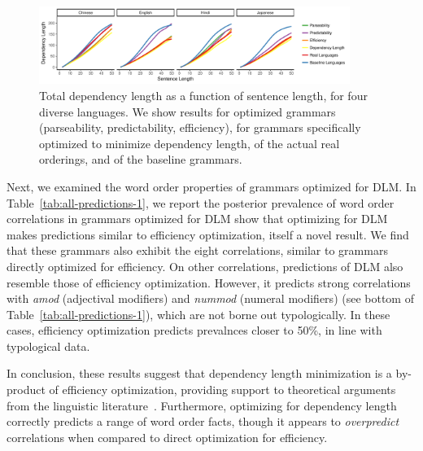 \documentclass[10pt,twoside,lineno]{article}
\begin{document}
\begin{figure}[ht]
    \centering
    \includegraphics[width=0.9\textwidth]{../results/dependency-length/figures/depLength-facet.pdf} 
        \caption{Total dependency length as a function of sentence length, for four diverse languages. We show results for optimized grammars (parseability, predictability, efficiency), for grammars specifically optimized to minimize dependency length, of the actual real orderings, and of the baseline grammars.}
    \label{fig:dlm-4langs}
\end{figure}


Next, we examined the word order properties of grammars optimized for DLM.
In Table~\ref{tab:all-predictions-1}, we report the posterior prevalence of word order correlations in grammars optimized for DLM show that optimizing for DLM makes predictions similar to efficiency optimization, itself a novel result.
We find that these grammars also exhibit the eight correlations, similar to grammars directly optimized for efficiency.
On other correlations, predictions of DLM also resemble those of efficiency optimization.
However, it predicts strong correlations with \textit{amod} (adjectival modifiers) and \textit{nummod} (numeral modifiers) (see bottom of Table~\ref{tab:all-predictions-1}), which are not borne out typologically.
In these cases, efficiency optimization predicts prevalnces closer to 50\%, in line with typological data.

In conclusion, these results suggest that dependency length minimization is a by-product of efficiency optimization, providing support to theoretical arguments from the linguistic literature~\cite{hawkins1994performance,futrell2017memory, futrell2017generalizing}.
Furthermore, optimizing for dependency length correctly predicts a range of word order facts, though it appears to \emph{overpredict} correlations when compared to direct optimization for efficiency.




\end{document}
